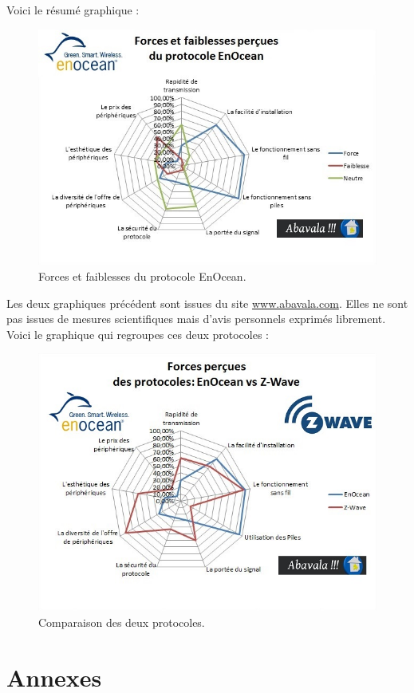 \documentclass[a4paper,10pt]{article}
\begin{document}
Voici le résumé graphique :
\begin{figure}[H]
\centering\includegraphics[scale=0.7]{forces-protocole-enocean.jpg}
\caption{Forces et faiblesses du protocole EnOcean.}
\end{figure}

Les deux graphiques précédent sont issues du site \url{www.abavala.com}. Elles ne sont pas issues de mesures scientifiques mais d’avis personnels exprimés librement. Voici le graphique qui regroupes ces deux protocoles :

\begin{figure}[H]
\centering\includegraphics[scale=0.7]{forces-enocean-vs-z-wave.jpg}
\caption{Comparaison des deux protocoles.}
\end{figure}

\section{Annexes}


 
\end{document}
